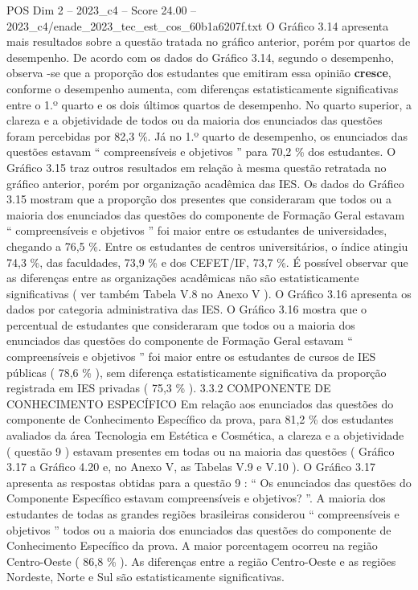 \begin{textsample}{POS Dim 2 – 2023\_c4 – Score 24.00 – 2023\_c4/enade\_2023\_tec\_est\_cos\_60b1a6207f.txt}
O Gráfico 3.14 apresenta mais resultados sobre a questão tratada no gráfico anterior, porém por quartos de desempenho.
De acordo com os dados do Gráfico 3.14, segundo o desempenho, observa -se que a proporção dos estudantes que emitiram essa opinião \textbf{cresce}, conforme o desempenho aumenta, com diferenças estatisticamente significativas entre o 1.º quarto e os dois últimos quartos de desempenho.
No quarto superior, a clareza e a objetividade de todos ou da maioria dos enunciados das questões foram percebidas por 82,3 \%.
Já no 1.º quarto de desempenho, os enunciados das questões estavam “ compreensíveis e objetivos ” para 70,2 \% dos estudantes.
O Gráfico 3.15 traz outros resultados em relação à mesma questão retratada no gráfico anterior, porém por organização acadêmica das IES.
Os dados do Gráfico 3.15 mostram que a proporção dos presentes que consideraram que todos ou a maioria dos enunciados das questões do componente de Formação Geral estavam “ compreensíveis e objetivos ” foi maior entre os estudantes de universidades, chegando a 76,5 \%.
Entre os estudantes de centros universitários, o índice atingiu 74,3 \%, das faculdades, 73,9 \% e dos CEFET/IF, 73,7 \%.
É possível observar que as diferenças entre as organizações acadêmicas não são estatisticamente significativas ( ver também Tabela V.8 no Anexo V ).
O Gráfico 3.16 apresenta os dados por categoria administrativa das IES.
O Gráfico 3.16 mostra que o percentual de estudantes que consideraram que todos ou a maioria dos enunciados das questões do componente de Formação Geral estavam “ compreensíveis e objetivos ” foi maior entre os estudantes de cursos de IES públicas ( 78,6 \% ), sem diferença estatisticamente significativa da proporção registrada em IES privadas ( 75,3 \% ). 3.3.2 COMPONENTE DE CONHECIMENTO ESPECÍFICO Em relação aos enunciados das questões do componente de Conhecimento Específico da prova, para 81,2 \% dos estudantes avaliados da área Tecnologia em Estética e Cosmética, a clareza e a objetividade ( questão 9 ) estavam presentes em todas ou na maioria das questões ( Gráfico 3.17 a Gráfico 4.20 e, no Anexo V, as Tabelas V.9 e V.10 ).
O Gráfico 3.17 apresenta as respostas obtidas para a questão 9 : “ Os enunciados das questões do Componente Específico estavam compreensíveis e objetivos? ”.
A maioria dos estudantes de todas as grandes regiões brasileiras considerou “ compreensíveis e objetivos ” todos ou a maioria dos enunciados das questões do componente de Conhecimento Específico da prova.
A maior porcentagem ocorreu na região Centro-Oeste ( 86,8 \% ).
As diferenças entre a região Centro-Oeste e as regiões Nordeste, Norte e Sul são estatisticamente significativas.

\end{textsample}
